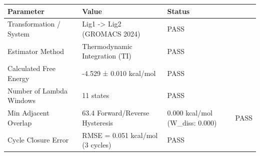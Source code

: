 \begin{tabular}{lll}
\toprule
Parameter & Value & Status \\
\midrule
Transformation / System & Lig1 -> Lig2 (GROMACS 2024) & PASS \\
Estimator Method & Thermodynamic Integration (TI) & PASS \\
Calculated Free Energy & -4.529 ± 0.010 kcal/mol & PASS \\
Number of Lambda Windows & 11 states & PASS \\
Min Adjacent Overlap & 63.4%
Forward/Reverse Hysteresis & 0.000 kcal/mol (W_diss: 0.000) & PASS \\
Cycle Closure Error & RMSE = 0.051 kcal/mol (3 cycles) & PASS \\
\bottomrule
\end{tabular}
